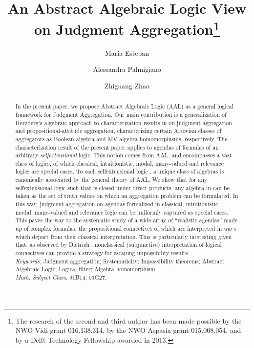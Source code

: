 \documentclass{llncs}
\numberwithin{equation}{section}
\begin{document}
\mainmatter              		\pagestyle{headings}
\title{An Abstract Algebraic Logic View on Judgment Aggregation\thanks{The research of the second and third author has been made possible by the NWO Vidi grant 016.138.314, by the NWO Aspasia grant 015.008.054, and by a Delft Technology Fellowship awarded in 2013.}}
\author{Mar\'ia Esteban
\and
Alessandra Palmigiano
\and
 Zhiguang Zhao}

\maketitle
\thispagestyle{empty}

\begin{abstract}
In the present paper, we propose  Abstract Algebraic Logic (AAL) as a general logical framework for Judgment Aggregation. Our main contribution is a generalization of Herzberg's algebraic approach to characterization results in  on judgment aggregation and propositional-attitude aggregation, characterizing certain Arrovian classes of aggregators as Boolean algebra and MV-algebra homomorphisms, respectively.
 The characterization result of the present paper applies to  agendas of formulas of an arbitrary {\em selfextensional} logic.
This notion comes from AAL, and encompasses a vast class of logics, of which classical, intuitionistic, modal, many-valued and relevance logics are special cases. To each selfextensional logic , a unique class of algebras  is canonically associated by the general theory of AAL. We show that for any selfextensional logic  such that  is closed under direct products, any algebra in  can be taken as the set of truth values on which an aggregation problem can be formulated.
In this way, judgment aggregation on agendas formalized in  classical, intuitionistic, modal, many-valued and relevance logic can be uniformly captured as special cases.
This paves the way to the systematic study of a wide array of ``realistic agendas'' made up of complex formulas, the propositional connectives of which are interpreted in ways which depart from their classical interpretation.
This is particularly interesting given that, as observed by Dietrich \cite{Di10},  nonclassical (subjunctive) interpretation of logical connectives can provide a strategy for escaping impossibility results.\\
{\em Keywords:} Judgment aggregation; Systematicity; Impossibility theorems; Abstract Algebraic Logic; Logical filter; Algebra homomorphism.\\
{\em Math. Subject Class.} 91B14; 03G27.
\end{abstract}
\end{document}
